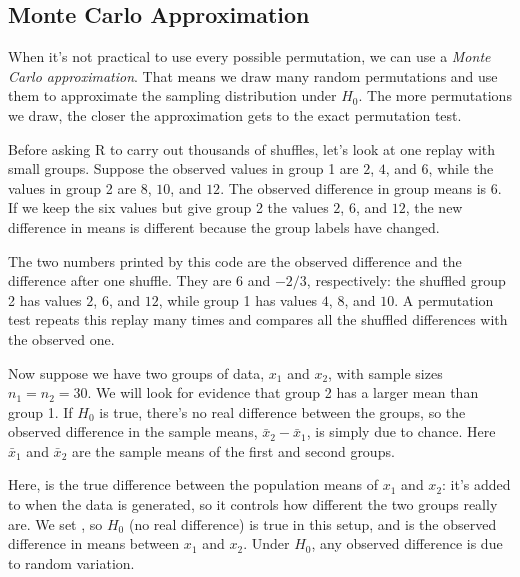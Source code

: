\subsection{Monte Carlo Approximation}

When it's not practical to use every possible permutation, we can use
a \emph{Monte Carlo approximation}.
That means we draw many random permutations and use them to approximate
the sampling distribution under $H_0$. The more permutations we draw,
the closer the approximation gets to the exact permutation test.

\begin{example}
Before asking R to carry out thousands of shuffles, let's look at one
replay with small groups. Suppose the observed values in group 1 are
$2$, $4$, and $6$, while the values in group 2 are $8$, $10$, and
$12$. The observed difference in group means is $6$. If we keep the
six values but give group 2 the values $2$, $6$, and $12$, the new
difference in means is different because the group labels have changed.

The two numbers printed by this code are the observed difference and
the difference after one shuffle. They are $6$ and $-2/3$, respectively:
the shuffled group 2 has values $2$, $6$, and $12$, while group 1 has
values $4$, $8$, and $10$. A permutation test repeats this replay many
times and compares all the shuffled differences with the observed one.

Now suppose we have two groups of data, $x_1$ and $x_2$, with
sample sizes
$n_1 = n_2 = 30$. We will look for evidence that group 2 has a larger
mean than group 1. If $H_0$ is true, there's no real difference between
the groups, so the observed difference in the sample means,
$\bar{x}_2 - \bar{x}_1$, is simply due to chance. Here $\bar{x}_1$ and
$\bar{x}_2$ are the sample means of the first and second groups.


Here,  is the true difference between the population means
of $x_1$ and $x_2$: it's added to  when the data is
generated, so it controls how different the two groups really are. We
set , so $H_0$ (no real difference) is true in this
setup, and  is the observed difference in means between $x_1$
and $x_2$. Under $H_0$, any observed difference is due to random
variation.


\end{example}

